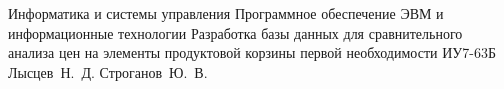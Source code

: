 \documentclass{bmstu}
\begin{document}
\makecourseworktitle
{Информатика и системы управления}
{Программное обеспечение ЭВМ и информационные технологии}
{Разработка базы данных для сравнительного анализа цен на элементы продуктовой корзины первой необходимости}
{ИУ7-63Б}
{Лысцев~Н.~Д.}
{Строганов~Ю.~В.}
{}
{}

\setcounter{page}{3}

\maketableofcontents

%
%


%
%
%
%

\makebibliography

%
\end{document}
